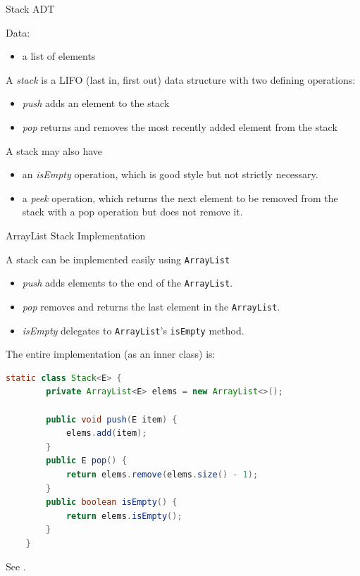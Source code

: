 \documentclass{beamer}
\begin{document}
\begin{frame}[fragile]{Stack ADT}

Data:
\begin{itemize}
  \item a list of elements
\end{itemize}

A {\it stack} is a LIFO (last in, first out) data structure with two defining operations:
\begin{itemize}
\item {\it push} adds an element to the stack
\item {\it pop} returns and removes the most recently added element from the stack
\end{itemize}

A stack may also have
\begin{itemize}
\item an {\it isEmpty} operation, which is good style but not strictly necessary.
\item a {\it peek} operation, which returns the next element to be removed from the stack with a pop operation but does not remove it.
\end{itemize}



\end{frame}

\begin{frame}[fragile]{ArrayList Stack Implementation}

\vspace{-.05in}
A stack can be implemented easily using {\tt ArrayList}

\begin{itemize}
\item {\it push} adds elements to the end of the {\tt ArrayList}.
\item {\it pop} removes and returns the last element in the {\tt ArrayList}.
\item {\it isEmpty} delegates to {\tt ArrayList}'s {\tt isEmpty} method.
\end{itemize}

The entire implementation (as an inner class) is:
\begin{lstlisting}[language=Java]
    static class Stack<E> {
        private ArrayList<E> elems = new ArrayList<>();

        public void push(E item) {
            elems.add(item);
        }
        public E pop() {
            return elems.remove(elems.size() - 1);
        }
        public boolean isEmpty() {
            return elems.isEmpty();
        }
    }
\end{lstlisting}
\vspace{-.05in}
See .

\end{frame}
\end{document}
